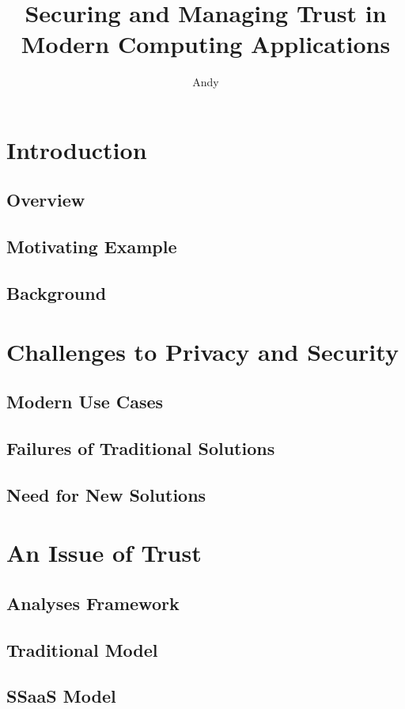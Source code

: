 \documentclass[defaultstyle,11pt]{thesis}
\title{Securing and Managing Trust in Modern Computing Applications}
\author{Andy}{Sayler}
\begin{document}


%
\chapter{Introduction}
\label{chap:intro}

\section{Overview}
\section{Motivating Example}
\section{Background}

%
\chapter{Challenges to Privacy and Security}
\label{chap:challenges}

\section{Modern Use Cases}
\section{Failures of Traditional Solutions}
\section{Need for New Solutions}

%
\chapter{An Issue of Trust}
\label{chap:trust}

\section{Analyses Framework}
\section{Traditional Model}
\section{SSaaS Model}
\end{document}
